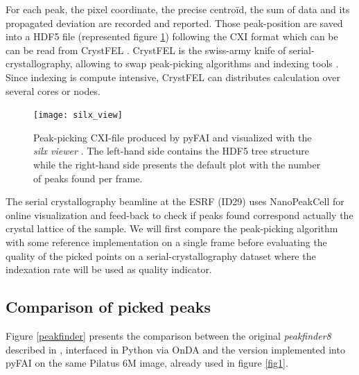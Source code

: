 \documentclass[preprint]{iucr}              %
\begin{document}
For each peak, the pixel coordinate, the precise centroïd, the sum of data and its propagated deviation are recorded and reported. 
Those peak-position are saved into a HDF5 file (represented figure \ref{silx}) following the CXI format \cite{cxi} which can be can be read from CrystFEL \cite{CrystFEL}.
CrystFEL is the swiss-army knife of serial-crystallography, allowing to swap peak-picking algorithms \cite{zaefferer, Cheetah2014, robustpeakfinder} and indexing tools \cite{xds, mosflm, taketwo, xgandalf, pinkindexer}.
Since indexing is compute intensive, CrystFEL can distributes calculation over several cores or nodes.

\begin{figure}
\label{silx}
\texttt{[image: silx\_view]}
\caption{Peak-picking CXI-file produced by pyFAI and visualized with the \textit{silx viewer} \cite{silx}.
The left-hand side contains the HDF5 tree structure while the right-hand side presents the default plot with the number of peaks found per frame.}
\end{figure}

The serial crystallography beamline at the ESRF (ID29) uses NanoPeakCell \cite{nanopeakcell} for online visualization and feed-back to check if peaks found correspond actually the crystal lattice of the sample.
We will first compare the peak-picking algorithm with some reference implementation on a single frame before evaluating the quality of the picked points on a serial-crystallography dataset where the indexation rate will be used as quality indicator.

\subsection{Comparison of picked peaks}
Figure \ref{peakfinder} presents the comparison between the original \textit{peakfinder8} described in , interfaced in Python via OnDA \cite{onda} and the version implemented into pyFAI on the same Pilatus 6M image, already used in figure \ref{fig1}. 
\end{document}
